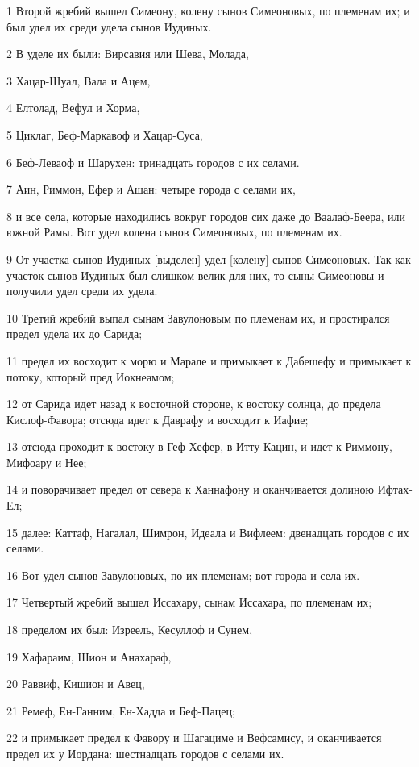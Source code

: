 \par 1 Второй жребий вышел Симеону, колену сынов Симеоновых, по племенам их; и был удел их среди удела сынов Иудиных.
\par 2 В уделе их были: Вирсавия или Шева, Молада,
\par 3 Хацар-Шуал, Вала и Ацем,
\par 4 Елтолад, Вефул и Хорма,
\par 5 Циклаг, Беф-Маркавоф и Хацар-Суса,
\par 6 Беф-Леваоф и Шарухен: тринадцать городов с их селами.
\par 7 Аин, Риммон, Ефер и Ашан: четыре города с селами их,
\par 8 и все села, которые находились вокруг городов сих даже до Ваалаф-Беера, или южной Рамы. Вот удел колена сынов Симеоновых, по племенам их.
\par 9 От участка сынов Иудиных [выделен] удел [колену] сынов Симеоновых. Так как участок сынов Иудиных был слишком велик для них, то сыны Симеоновы и получили удел среди их удела.
\par 10 Третий жребий выпал сынам Завулоновым по племенам их, и простирался предел удела их до Сарида;
\par 11 предел их восходит к морю и Марале и примыкает к Дабешефу и примыкает к потоку, который пред Иокнеамом;
\par 12 от Сарида идет назад к восточной стороне, к востоку солнца, до предела Кислоф-Фавора; отсюда идет к Даврафу и восходит к Иафие;
\par 13 отсюда проходит к востоку в Геф-Хефер, в Итту-Кацин, и идет к Риммону, Мифоару и Нее;
\par 14 и поворачивает предел от севера к Ханнафону и оканчивается долиною Ифтах-Ел;
\par 15 далее: Каттаф, Нагалал, Шимрон, Идеала и Вифлеем: двенадцать городов с их селами.
\par 16 Вот удел сынов Завулоновых, по их племенам; вот города и села их.
\par 17 Четвертый жребий вышел Иссахару, сынам Иссахара, по племенам их;
\par 18 пределом их был: Изреель, Кесуллоф и Сунем,
\par 19 Хафараим, Шион и Анахараф,
\par 20 Раввиф, Кишион и Авец,
\par 21 Ремеф, Ен-Ганним, Ен-Хадда и Беф-Пацец;
\par 22 и примыкает предел к Фавору и Шагациме и Вефсамису, и оканчивается предел их у Иордана: шестнадцать городов с селами их.

